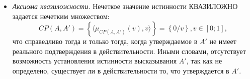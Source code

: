 \begin{itemize}
\begin{figure}[ht]
	\newcommand{\aOne}{0.5}
	\newcommand{\bOne}{0.05}
	\newcommand{\aTwo}{0.5}
	\newcommand{\bTwo}{0.05}
	\begin{subfigure}[t]{0.5\textwidth}
		\caption{$\mu_{A'}(x; a_2, b_2) = 1 - \mu_A(x; a_1, b_1)$ при $a_1 = a_2, b_1 = b_2$}
	\end{subfigure}
	\begin{subfigure}[t]{0.5\textwidth}
		\caption{$\mu_{CP(A,A')}(v)$ при $\mu_{A'}(x) = 1 - \mu_A(x)$}
	\end{subfigure}
	\label{fig:ftv-gauss-quazi-true}
\end{figure}

На рис. представлены графики совпадающих функций принадлежности высказываний и рассчитанной функции принадлежности нечеткого значения истинности.

\item \textit{Аксиома квазиложности.} Нечеткое значение истинности КВАЗИЛОЖНО задается нечетким множеством:
\begin{equation*} 
CP(A,A') = \left\{\langle\mu_{CP(A,A')}(v), v\rangle\right\} = \left\{0/v\right\}, v \in [0; 1],
\end{equation*}
что справедливо тогда и только тогда, когда утверждаемое в $A'$ не имеет реального подтверждения в действительности. Иными словами, отсутствует возможность установления истинности высказывания $A'$, так как не определено, существует ли в действительности то, что утверждается в $A'$.


\end{itemize}
